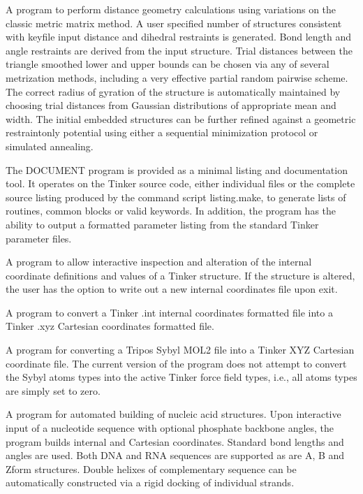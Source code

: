 \documentclass[letterpaper,11pt,english]{sphinxmanual}
\begin{document}

A program to perform distance geometry calculations using variations on the classic metric matrix method. A user specified number of structures consistent with keyfile input distance and dihedral restraints is generated. Bond length and angle restraints are derived from the input structure. Trial distances between the triangle smoothed lower and upper bounds can be chosen via any of several metrization methods, including a very effective partial random pairwise scheme. The correct radius of gyration of the structure is automatically maintained by choosing trial distances from Gaussian distributions of appropriate mean and width. The initial embedded structures can be further refined against a geometric restraint\sphinxhyphen{}only potential using either a sequential minimization protocol or simulated annealing.


The DOCUMENT program is provided as a minimal listing and documentation tool. It operates on the Tinker source code, either individual files or the complete source listing produced by the command script listing.make, to generate lists of routines, common blocks or valid keywords. In addition, the program has the ability to output a formatted parameter listing from the standard Tinker parameter files.


A program to allow interactive inspection and alteration of the internal coordinate definitions and values of a Tinker structure. If the structure is altered, the user has the option to write out a new internal coordinates file upon exit.


A program to convert a Tinker .int internal coordinates formatted file into a Tinker .xyz Cartesian coordinates formatted file.


A program for converting a Tripos Sybyl MOL2 file into a Tinker XYZ Cartesian coordinate file. The current version of the program does not attempt to convert the Sybyl atoms types into the active Tinker force field types, i.e., all atoms types are simply set to zero.


A program for automated building of nucleic acid structures. Upon interactive input of a nucleotide sequence with optional phosphate backbone angles, the program builds internal and Cartesian coordinates. Standard bond lengths and angles are used. Both DNA and RNA sequences are supported as are A\sphinxhyphen{}, B\sphinxhyphen{} and Z\sphinxhyphen{}form structures. Double helixes of complementary sequence can be automatically constructed via a rigid docking of individual strands.
\end{document}
